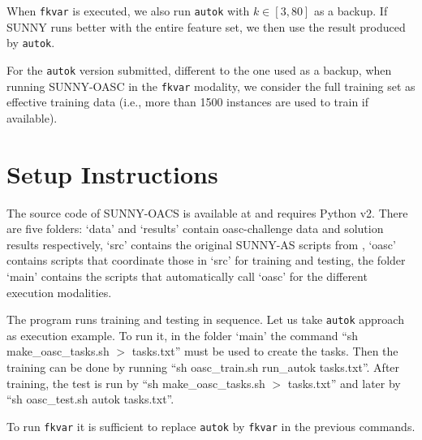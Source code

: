 \documentclass[tablecaption=bottom,wcp]{jmlr} %
\begin{document}
When \texttt{fkvar} is executed, we also run 
\texttt{autok} with $k \in [3,80]$ as a backup. If SUNNY runs better with the 
entire feature set, we then use the result produced by \texttt{autok}.

For the \texttt{autok} version submitted, different to the one used as a 
backup, when running SUNNY-OASC in the \texttt{fkvar} modality, we consider the 
full training set as effective training data (i.e., more than 1500 
instances are used to train if available). 

\section{Setup Instructions}

The source code of SUNNY-OACS is available at \cite{sunnyoasc} and requires 
Python v2. There are five folders: `data' and `results' contain oasc-challenge 
data and solution results respectively, `src' contains the original SUNNY-AS 
scripts from \cite{sunnyas}, `oasc' contains scripts that coordinate those in 
`src' for training and testing, the folder `main' contains the scripts that 
automatically call `oasc' for the different execution modalities. 

The program runs training and testing in sequence. Let us take \texttt{autok} 
approach as execution example. To run it, in the folder `main' the 
command ``sh make\_oasc\_tasks.sh $>$ tasks.txt'' must be used to create 
the tasks. Then the training can be done by running ``sh oasc\_train.sh 
run\_autok tasks.txt''. After training, the test is run by ``sh 
make\_oasc\_tasks.sh $>$ tasks.txt'' and later by ``sh oasc\_test.sh autok 
tasks.txt''.

To run \texttt{fkvar} it is sufficient to replace 
 \texttt{autok} by \texttt{fkvar} in the previous commands. 



\end{document}
